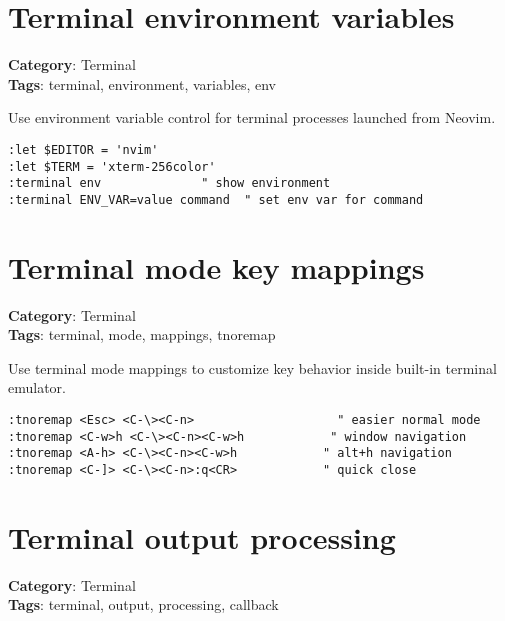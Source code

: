 {{{{{{{{{\section{Terminal environment variables}

\textbf{Category}: Terminal\\ \textbf{Tags}: terminal, environment, variables, env
\vspace{0.5cm}

Use environment variable control for terminal processes launched from Neovim.

\begin{Exa*}{}
\begin{Verbatim}[fontsize=\footnotesize, breaklines, breakanywhere]
:let $EDITOR = 'nvim'
:let $TERM = 'xterm-256color'
:terminal env              " show environment
:terminal ENV_VAR=value command  " set env var for command
\end{Verbatim}
\end{Exa*}

\section{Terminal mode key mappings}

\textbf{Category}: Terminal\\ \textbf{Tags}: terminal, mode, mappings, tnoremap
\vspace{0.5cm}

Use terminal mode mappings to customize key behavior inside built-in terminal emulator.

\begin{Exa*}{}
\begin{Verbatim}[fontsize=\footnotesize, breaklines, breakanywhere]
:tnoremap <Esc> <C-\><C-n>                    " easier normal mode
:tnoremap <C-w>h <C-\><C-n><C-w>h            " window navigation
:tnoremap <A-h> <C-\><C-n><C-w>h            " alt+h navigation
:tnoremap <C-]> <C-\><C-n>:q<CR>            " quick close
\end{Verbatim}
\end{Exa*}

\section{Terminal output processing}

\textbf{Category}: Terminal\\ \textbf{Tags}: terminal, output, processing, callback
\vspace{0.5cm}

}}}}}}}}}
